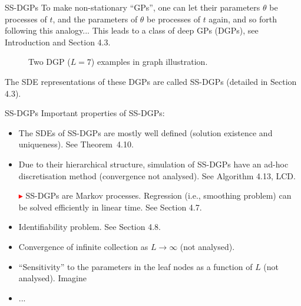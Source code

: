 \documentclass[seriffont, cmap=Beijing, 10pt]{zz}
\begin{document}
\begin{frame}{SS-DGPs}
		To make \alert{non-stationary} ``GPs'', one can let their parameters $\theta$ be processes of $t$, and the parameters of $\theta$ be processes of $t$ again, and so forth following this analogy...
		This leads to \alert{a} class of \alert{deep GPs (DGPs)}, see Introduction and \alert{Section 4.3}.
	\begin{figure}[t!]
		\centering
		\resizebox{.35\linewidth}{!}{%
			
		}
		\resizebox{.3165\linewidth}{!}{%
			
		}
		\caption{Two DGP ($L=7$) examples in graph illustration.}
	\end{figure}
	The SDE representations of these DGPs are called \alert{SS-DGPs (detailed in Section 4.3).}
\end{frame}

\begin{frame}{SS-DGPs}
		Important properties of SS-DGPs:
		\begin{itemize}
			\item The SDEs of SS-DGPs are mostly well defined (solution existence and uniqueness). See \alert{Theorem~4.10}.
			\item Due to their hierarchical structure, simulation of SS-DGPs have an ad-hoc discretisation method (convergence not analysed). See \alert{Algorithm 4.13, LCD}. 
			\item[\textcolor{red}{$\blacktriangleright$}] SS-DGPs are \alert{Markov} processes. Regression (i.e., smoothing problem) can be solved efficiently in \alert{linear} time. See \alert{Section 4.7}.
			\item Identifiability problem. See \alert{Section 4.8}.
			\item Convergence of infinite collection as $L\to\infty$ (not analysed).
			\item ``Sensitivity'' to the parameters in the leaf nodes as a function of $L$ (not analysed). Imagine \resizebox{.3\linewidth}{!}{%
				
			}
			\item ...
		\end{itemize}
\end{frame}
\end{document}

